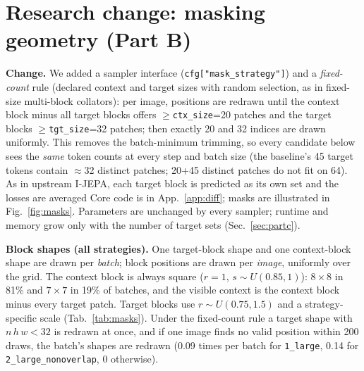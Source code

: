 \documentclass[10pt]{article}
\begin{document}
\section{Research change: masking geometry (Part B)}
\label{sec:partb}
\textbf{Change.} We added a sampler interface (\texttt{cfg["mask\_strategy"]}) and a \emph{fixed-count} rule (declared context and
target sizes with random selection, as in fixed-size multi-block collators): per image, positions are redrawn until the context block minus all
target blocks offers $\ge$\texttt{ctx\_size}=20 patches and the target blocks $\ge$\texttt{tgt\_size}=32 patches; then exactly
20 and 32 indices are drawn uniformly. This removes the batch-minimum trimming, so every candidate below sees the
\emph{same} token counts at every step and batch size (the baseline's 45 target tokens contain $\approx$32 distinct patches;
20+45 distinct patches do not fit on 64). As in upstream I-JEPA, each target block is predicted as its own set and the
losses are averaged
Core code is in
App.~\ref{app:diff}; masks are illustrated in Fig.~\ref{fig:masks}. Parameters are unchanged by every sampler; runtime and
memory grow only with the number of target sets (Sec.~\ref{sec:partc}).

\textbf{Block shapes (all strategies).} 
One target-block shape and one context-block shape are drawn per \emph{batch}; block positions are drawn per \emph{image},
uniformly over the grid. The context block is always square ($r{=}1$, $s\sim U(0.85,1)$): $8{\times}8$ in 81\% and
$7{\times}7$ in 19\% of batches, and the visible context is the context block minus every target patch. Target blocks use
$r\sim U(0.75,1.5)$ and a strategy-specific scale (Tab.~\ref{tab:masks}). Under the fixed-count rule a target shape with
$n\,h\,w<32$ is redrawn at once, and if one image finds no valid position within 200 draws, the batch's shapes are redrawn
(0.09 times per batch for \texttt{1\_large}, 0.14 for \texttt{2\_large\_nonoverlap}, 0 otherwise).
\end{document}
